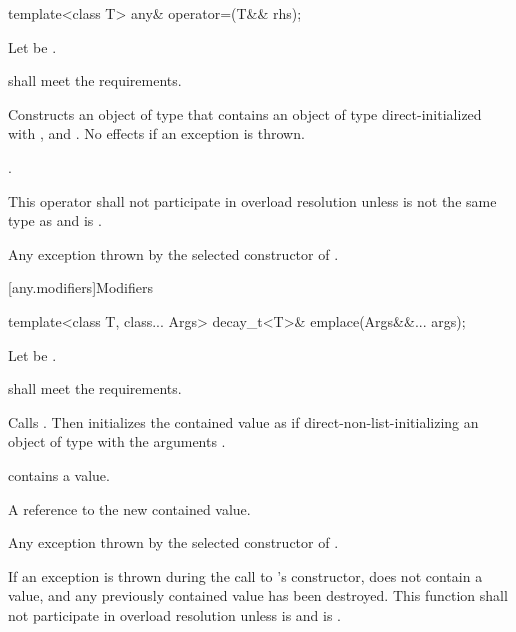 %
\begin{itemdecl}
template<class T>
  any& operator=(T&& rhs);
\end{itemdecl}

\begin{itemdescr}
\pnum
Let  be .

\pnum
\requires
{} shall meet the  requirements.

\pnum
\effects
Constructs an object  of type  that contains an object of type  direct-initialized with , and .
No effects if an exception is thrown.

\pnum
\returns
{}.

\pnum
\remarks
This operator shall not participate in overload resolution unless
 is not the same type as  and
 is .

\pnum
\throws
Any exception thrown by the selected constructor of .
\end{itemdescr}

[any.modifiers]{Modifiers}

%
\begin{itemdecl}
template<class T, class... Args>
  decay_t<T>& emplace(Args&&... args);
\end{itemdecl}

\begin{itemdescr}
\pnum
Let  be .

\pnum
\requires
{} shall meet the  requirements.

\pnum
\effects
Calls .
Then initializes the contained value as if direct-non-list-initializing
an object of type  with the arguments .

\pnum
\ensures
{} contains a value.

\pnum
\returns
A reference to the new contained value.

\pnum
\throws
Any exception thrown by the selected constructor of .

\pnum
\remarks
If an exception is thrown during the call to 's constructor,
 does not contain a value, and any previously contained value
has been destroyed.
This function shall not participate in overload resolution unless
 is  and
 is .
\end{itemdescr}

